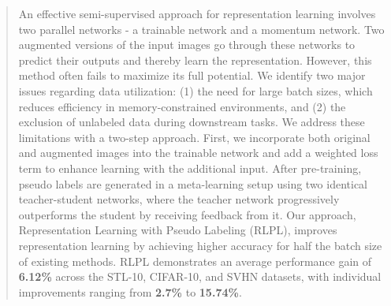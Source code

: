 \begin{abstract}
An effective semi-supervised approach for representation learning involves two parallel networks - a trainable network and a momentum network. Two augmented versions of the input images go through these networks to predict their outputs and thereby learn the representation. However, this method often fails to maximize its full potential. We identify two major issues regarding data utilization: (1) the need for large batch sizes, which reduces efficiency in memory-constrained environments, and (2) the exclusion of unlabeled data during downstream tasks. We address these limitations with a two-step approach. First, we incorporate both original and augmented images into the trainable network and add a weighted loss term to enhance learning with the additional input. After pre-training, pseudo labels are generated in a meta-learning setup using two identical teacher-student networks, where the teacher network progressively outperforms the student by receiving feedback from it. Our approach, Representation Learning with Pseudo Labeling (RLPL), improves representation learning by achieving higher accuracy for half the batch size of existing methods. RLPL demonstrates an average performance gain of \textbf{6.12\%} across the STL-10, CIFAR-10, and SVHN datasets, with individual improvements ranging from  \textbf{2.7\%} to \textbf{15.74\%}.
\end{abstract}